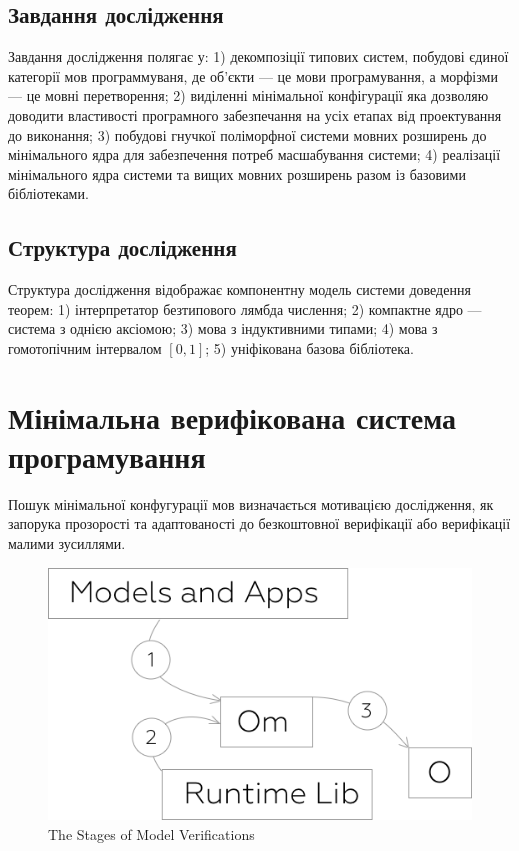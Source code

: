 \documentclass{article}
\begin{document}
\subsection{Завдання дослідження}

Завдання дослідження полягає у:
1) декомпозіції типових систем,
побудові єдиної категорії мов программуваня, де
об'єкти --- це мови програмування, а морфізми --- це мовні перетворення;
2) виділенні мінімальної конфігурації яка дозволяю доводити
властивості програмного забезпечання на усіх етапах від проектування до виконання;
3) побудові гнучкої поліморфної системи мовних розширень до
мінімального ядра для забезпечення потреб масшабування системи;
4) реалізації мінімального ядра системи та вищих мовних
розширень разом із базовими бібліотеками.

\subsection{Структура дослідження}

Структура дослідження відображає компонентну модель системи доведення теорем:
1) інтерпретатор безтипового лямбда числення;
2) компактне ядро --- система з однією аксіомою;
3) мова з індуктивними типами;
4) мова з гомотопічним інтервалом $[0,1]$;
5) уніфікована базова бібліотека.

\section{Мінімальна верифікована система програмування}

Пошук мінімальної конфугурації мов визначається мотивацією дослідження,
як запорука прозорості та адаптованості до безкоштовної верифікації
або верифікації малими зусиллями.

\begin{figure}[h]
  \centerline{\includegraphics[scale=0.28]{minimal}}
  \caption{The Stages of Model Verifications}
\end{figure}
\end{document}
